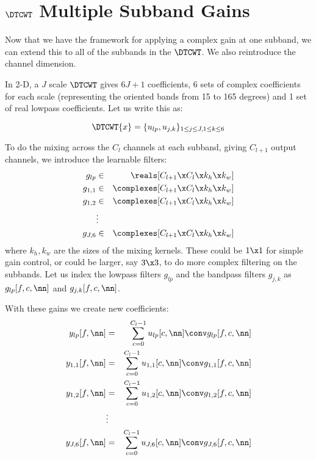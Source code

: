 \section{$\DTCWT$ Multiple Subband Gains}\label{sec:ch6:multiple_subbands}

Now that we have the framework for applying a complex gain at one subband, we
can extend this to all of the subbands in the $\DTCWT$. We also reintroduce the channel
dimension. 

In 2-D, a $J$ scale $\DTCWT$ gives $6J+1$ coefficients, 6 sets of complex
coefficients for each scale (representing the oriented bands from 15 to 165
degrees) and 1 set of real lowpass coefficients. Let us write this as:

\begin{equation}
  \DTCWT\{x\} = \{u_{lp}, u_{j,k} \}_{1\leq j\leq J, 1\leq k\leq 6}
  \label{eq:ch6:wave_coeffs}
\end{equation}

To do the mixing across the $C_l$ channels at each subband, giving $C_{l+1}$
output channels, we introduce the learnable filters:
%
\begin{eqnarray}
  g_{lp} &\in& \reals[C_{l+1}\x C_l\x k_h\x k_w] \\
  g_{1,1} &\in& \complexes[C_{l+1}\x C_l\x k_h\x k_w] \\
  g_{1,2} &\in& \complexes[C_{l+1}\x C_l\x k_h\x k_w] \\
      & \vdots &\\
  g_{J,6} &\in& \complexes[C_{l+1}\x C_l\x k_h\x k_w] 
\end{eqnarray}
%
where $k_h, k_w$ are the sizes of the mixing kernels. These could be $1\x 1$ for
simple gain control, or could be larger, say $3\x 3$, to do more complex
filtering on the subbands. Let us index the lowpass filters $g_{lp}$ and the
bandpass filters $g_{j,k}$ as $g_{lp}[f, c, \nn]$ and $g_{j,k}[f, c, \nn]$.

With these gains we create new coefficients:
\begin{eqnarray}
  y_{lp}[f, \nn] &= & \sum_{c=0}^{C_l-1} u_{lp}[c, \nn] \conv g_{lp}[f, c, \nn] \\
  y_{1,1}[f, \nn] &= & \sum_{c=0}^{C_l-1} u_{1,1}[c, \nn] \conv g_{1,1}[f, c, \nn] \\
  y_{1,2}[f, \nn] &= & \sum_{c=0}^{C_l-1} u_{1,2}[c, \nn] \conv g_{1,2}[f, c, \nn] \\
                  & \vdots & \\
  y_{J,6}[f, \nn] &= & \sum_{c=0}^{C_l-1} u_{J,6}[c, \nn] \conv g_{J,6}[f, c, \nn] 
\end{eqnarray}

